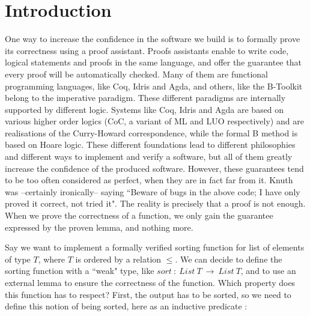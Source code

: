 \section{Introduction}


One way to increase the confidence in the software we build is to formally prove its correctness using a proof assistant. Proofs assistants enable to write code, logical statements and proofs in the same language, and offer the guarantee that every proof will be automatically checked. Many of them are functional programming languages, like Coq, Idris and Agda, and others, like the B-Toolkit belong to the imperative paradigm. These different paradigms are internally supported by different logic. Systems like Coq, Idris and Agda are based on various higher order logics (CoC, a variant of ML and LUO respectively) and are realisations of the Curry-Howard correspondence, while the formal B method is based on Hoare logic. These different foundations lead to different philosophies and different ways to implement and verify a software, but all of them greatly increase the confidence of the produced software. However, these guarantees tend to be too often considered as perfect, when they are in fact far from it. Knuth was --certainly ironically-- saying ``Beware of bugs in the above code; I have only proved it correct, not tried it". The reality is precisely that a proof is not enough. When we prove the correctness of a function, we only gain the guarantee expressed by the proven lemma, and nothing more. 

Say we want to implement a formally verified sorting function for list of elements of type $T$, where $T$ is ordered by a relation $\leq$.
We can decide to define the sorting function with a ``weak" type, like $sort\ :\ List\ T\ \rightarrow\ List\ T$, and to use an external lemma to ensure the correctness of the function. Which property does this function has to respect? First, the output has to be sorted, so we need to define this notion of being sorted, here as an inductive predicate :

